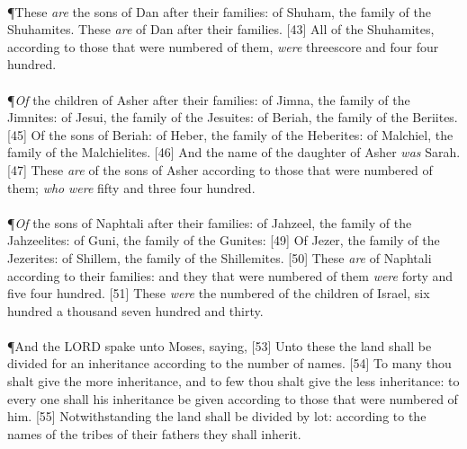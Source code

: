 \\
\P \textcolor[cmyk]{0.99998,1,0,0}{These \emph{are} the sons of Dan after their families: of Shuham, the family of the Shuhamites. These \emph{are}  of Dan after their families.}
[43] \textcolor[cmyk]{0.99998,1,0,0}{All  of the Shuhamites, according to those that were numbered of them, \emph{were} threescore and four  four hundred.}\\
\\
\P \textcolor[cmyk]{0.99998,1,0,0}{\emph{Of} the children of Asher after their families: of Jimna, the family of the Jimnites: of Jesui, the family of the Jesuites: of Beriah, the family of the Beriites.}
[45] \textcolor[cmyk]{0.99998,1,0,0}{Of the sons of Beriah: of Heber, the family of the Heberites: of Malchiel, the family of the Malchielites.}
[46] \textcolor[cmyk]{0.99998,1,0,0}{And the name of the daughter of Asher \emph{was} Sarah.}
[47] \textcolor[cmyk]{0.99998,1,0,0}{These \emph{are}  of the sons of Asher according to those that were numbered of them; \emph{who} \emph{were} fifty and three  four hundred.}\\
\\
\P \textcolor[cmyk]{0.99998,1,0,0}{\emph{Of} the sons of Naphtali after their families: of Jahzeel, the family of the Jahzeelites: of Guni, the family of the Gunites:}
[49] \textcolor[cmyk]{0.99998,1,0,0}{Of Jezer, the family of the Jezerites: of Shillem, the family of the Shillemites.}
[50] \textcolor[cmyk]{0.99998,1,0,0}{These \emph{are}  of Naphtali according to their families: and they that were numbered of them \emph{were} forty and five  four hundred.}
[51] \textcolor[cmyk]{0.99998,1,0,0}{These \emph{were} the numbered of the children of Israel, six hundred  a thousand seven hundred and thirty.}\\
\\
\P \textcolor[cmyk]{0.99998,1,0,0}{And the LORD spake unto Moses, saying,}
[53] \textcolor[cmyk]{0.99998,1,0,0}{Unto these the land shall be divided for an inheritance according to the number of names.}
[54] \textcolor[cmyk]{0.99998,1,0,0}{To many thou shalt give the more inheritance, and to few thou shalt give the less inheritance: to every one shall his inheritance be given according to those that were numbered of him.}
[55] \textcolor[cmyk]{0.99998,1,0,0}{Notwithstanding the land shall be divided by lot: according to the names of the tribes of their fathers they shall inherit.}
